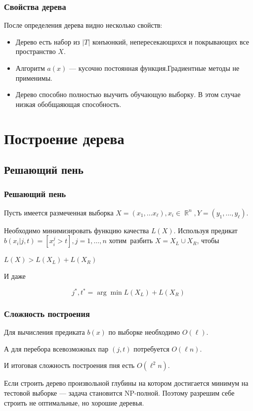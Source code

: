 \documentclass{beamer}
\DeclareMathOperator{\R}{\mathbb{R}}
\begin{document}
	\begin{frame}
		\frametitle{Свойства дерева}
		
		После определения дерева видно несколько свойств:
		\begin{itemize}
			\item Дерево есть набор из $|T|$ конъюнкий, непересекающихся и покрывающих все пространство $X$.
			\item Алгоритм $a(x)$ --- кусочно постоянная функция.Градиентные методы не применимы.
			\item Дерево способно полностью выучить обучающую выборку. В этом случае низкая обобщаяющая способность.
		\end{itemize}
	\end{frame}

	\section{Построение дерева}

	\subsection{Решающий пень}

	\begin{frame}
		\frametitle{Решающий пень}
		Пусть имеется размеченная выборка $X = (x_1, \dots x_{\ell}), x_i \in \R^n, Y = (y_1, ..., y_{\ell})$.

		\vspace{15pt}

		Необходимо минимизировать функцию качества $L(X)$.
		Используя предикат $b(x_i| j, t) = [x_i^j > t], j=1, \dots, n$ хотим~разбить $X = X_L \cup X_R$, чтобы

		$L(X) > L(X_L) + L(X_R)$

		\vspace{15pt}

		И даже 

		\[
		j^*, t^* = \arg \min L(X_L) + L(X_R)
		\]
	\end{frame}

	\begin{frame}
		\frametitle{Сложность построения}

		Для вычисления предиката $b(x)$ по выборке необходимо $O(\ell)$.

		А для перебора всевозможных пар $(j, t)$ потребуется $O(\ell n)$.

		И итоговая сложность построения пня есть $O(\ell^2 n)$.

		\vspace{15pt}

		Если строить дерево произвольной глубины на котором достигается минимум на тестовой выборке 
		--- задача становится NP-полной.
		Поэтому разрешим себе строить не оптимальные, но хорошие деревья.
	\end{frame}
\end{document}
